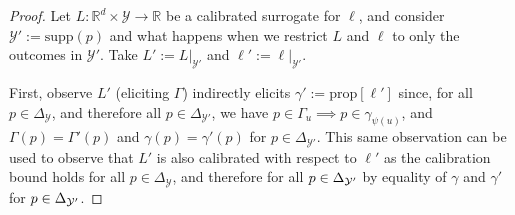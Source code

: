 \documentclass{article}
\newcommand{\reals}{\mathbb{R}}
\newcommand{\simplex}{\Delta_\Y}
\newcommand{\prop}[1]{\mathrm{prop}[#1]}
\newcommand{\supp}{\mathrm{supp}}
\newcommand{\Y}{\mathcal{Y}}
\begin{document}
\begin{proof}
	Let $L : \reals^d \times \Y \to \reals$ be a calibrated surrogate for $\ell$, and consider $\Y' := \supp(p)$ and what happens when we restrict $L$ and $\ell$ to only the outcomes in $\Y'$.
	Take $L' := L|_{\Y'}$ and $\ell' := \ell|_{\Y'}$.
	
	First, observe $L'$ (eliciting $\Gamma$) indirectly elicits $\gamma' := \prop{\ell'}$ since, for all $p \in \simplex$, and therefore all $p \in \Delta_{\Y'}$, we have $p \in \Gamma_u \implies p \in \gamma_{\psi(u)}$, and $\Gamma(p) = \Gamma'(p)$ and $\gamma(p) = \gamma'(p)$ for $p \in \Delta_{\Y'}$.
	This same observation can be used to observe that $L'$ is also calibrated with respect to $\ell'$ as the calibration bound holds for all $p \in \simplex$, and therefore for all $p \in \simplexp$ by equality of $\gamma$ and $\gamma'$ for $p \in \simplexp$.
	

\end{proof}
\end{document}
